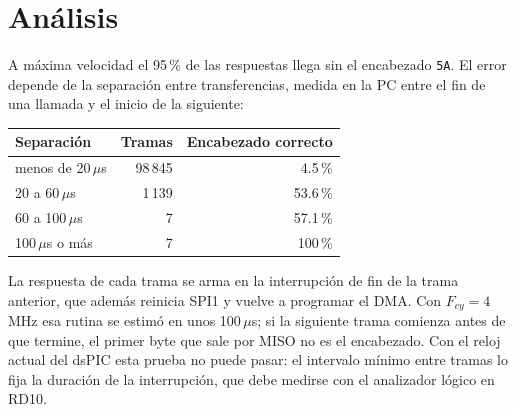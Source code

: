 \section{Análisis}

A máxima velocidad el 95\,\% de las respuestas llega sin el encabezado
\texttt{5A}. El error depende de la separación entre transferencias, medida en
la PC entre el fin de una llamada y el inicio de la siguiente:

\begin{table}[H]
\centering
\begin{tabular}{@{}lrr@{}}
\toprule
Separación & Tramas & Encabezado correcto \\
\midrule
menos de 20\,$\mu$s     & 98\,845 & 4.5\,\% \\
20 a 60\,$\mu$s         & 1\,139  & 53.6\,\% \\
60 a 100\,$\mu$s        & 7       & 57.1\,\% \\
100\,$\mu$s o más       & 7       & 100\,\% \\
\bottomrule
\end{tabular}
\end{table}

La respuesta de cada trama se arma en la interrupción de fin de la trama
anterior, que además reinicia SPI1 y vuelve a programar el DMA. Con
$F_{cy} = 4$\,MHz esa rutina se estimó en unos 100\,$\mu$s; si la siguiente
trama comienza antes de que termine, el primer byte que sale por MISO no es
el encabezado. Con el reloj actual del dsPIC esta prueba no puede pasar: el
intervalo mínimo entre tramas lo fija la duración de la interrupción, que
debe medirse con el analizador lógico en RD10.
